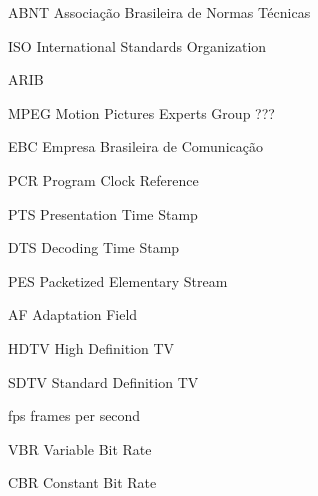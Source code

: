 \begin{siglas}
  \item[ABNT] Associação Brasileira de Normas Técnicas
  \item[ISO] International Standards Organization
  \item[ARIB]
  \item[MPEG] Motion Pictures Experts Group ???
  \item[EBC] Empresa Brasileira de Comunicação
  \item[PCR] Program Clock Reference
  \item[PTS] Presentation Time Stamp
  \item[DTS] Decoding Time Stamp
  \item[PES] Packetized Elementary Stream
  \item[AF] Adaptation Field
  \item[HDTV] High Definition TV
  \item[SDTV] Standard Definition TV
  \item[fps] frames per second
  \item[VBR] Variable Bit Rate
  \item[CBR] Constant Bit Rate
  \item[]
  \item[]
  \item[]
  
  
\end{siglas}